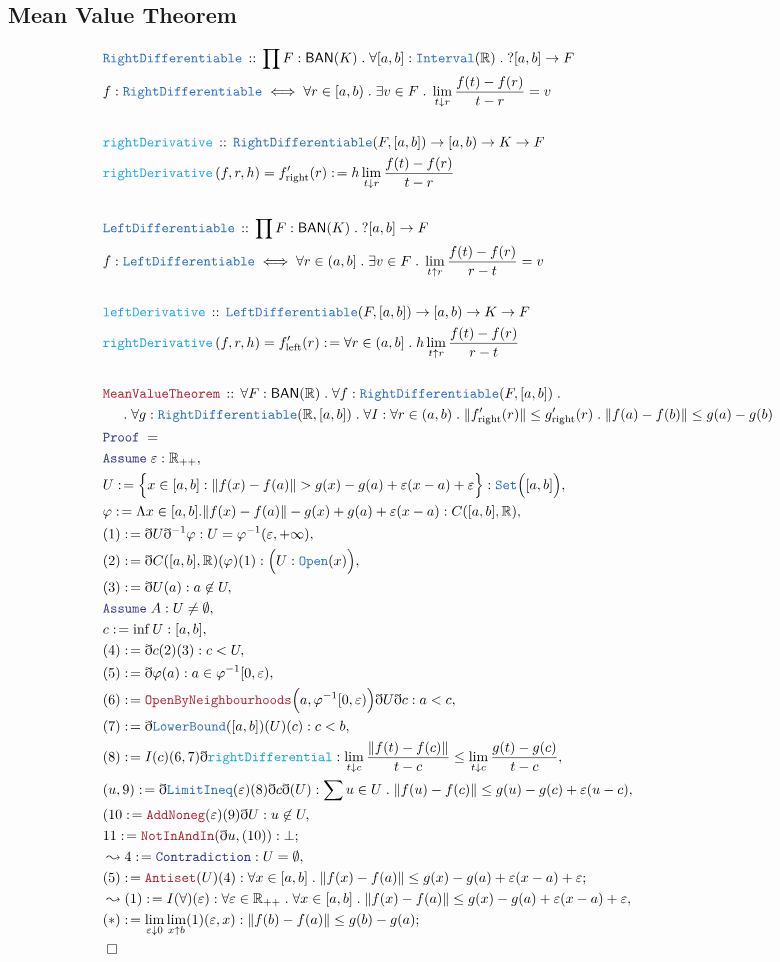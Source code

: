 \documentclass[12pt]{scrartcl}
\newcommand{\TYPE}[1]{\textcolor{NavyBlue}{\mathtt{#1}}}
\newcommand{\FUNC}[1]{\textcolor{Cerulean}{\mathtt{#1}}}
\newcommand{\LOGIC}[1]{\textcolor{Blue}{\mathtt{#1}}}
\newcommand{\THM}[1]{\textcolor{Maroon}{\mathtt{#1}}}
\renewcommand{\.}{\; . \;}
\newcommand{\de}{: \kern 0.1pc =}
\newcommand{\Act}[1]{\left( #1 \right)}
\newcommand{\Theorem}[2]{& \THM{#1} \, :: \, #2 \\ & \Proof = \\ }
\newcommand{\DeclareType}[2]{& \TYPE{#1} \, :: \, #2 \\}
\newcommand{\DefineType}[3]{& #1 : \TYPE{#2} \iff #3 \\}
\newcommand{\DeclareFunc}[2]{& \FUNC{#1} \, :: \, #2 \\}
\newcommand{\DefineNamedFunc}[4]{&  \FUNC{#1}\Act{#2} = #3 \de #4 \\}
\newcommand{\NewLine}{\\ & \kern 1pc}
\newcommand{\Page}[1]{\begin{align*} #1 \end{align*}   }
\newcommand{ \bd }{ \ByDef }
\newcommand{\Reals}{\mathbb{R} }
\newcommand{\Say}[3]{& #1 \de #2 : #3, \\}
\newcommand{\Conclude}[3]{& #1 \de #2 : #3; \\}
\newcommand{\Derive}[3]{& \leadsto #1 \de #2 : #3, \\}
\newcommand{\A}{\LOGIC{Assume} \;}
\newcommand{\Assume}[2]{& \A #1 : #2, \\}
\newcommand{\QED}{\; \square}
\newcommand{\EndProof}{& \QED \\}
\newcommand{\ByDef}{\eth}
\newcommand{\Proof}{\LOGIC{Proof} \; }
\newcommand{\BAN}{\mathsf{BAN}} %
\begin{document}
\subsection{Mean Value Theorem}
\Page{
	\DeclareType{RightDifferentiable}{ \prod F : \BAN(K) \. \forall [a,b] : \TYPE{Interval}(\Reals) \. ?[a,b] \to F }
	\DefineType{f}{RightDifferentiable}
	{ \forall r \in [a,b) \. \exists v \in F \. \lim_{t \downarrow r}  \frac{  f(t) - f(r) }{  t - r   } = v   }
	\\
	\DeclareFunc{rightDerivative}{ \TYPE{RightDifferentiable}(F,[a,b]) \to [a, b) \to  K \to F    }
	\DefineNamedFunc{rightDerivative}{ f,r,h  }{f'_{\mathrm{right}}(r)}{ h \lim_{t \downarrow r} \frac{ f(t) - f(r)}{  t - r }  
	}
	\\
	\DeclareType{LeftDifferentiable}{ \prod F : \BAN(K) \. ?[a,b] \to F }
	\DefineType{f}{LeftDifferentiable}
	{ \forall r \in (a,b] \. \exists v \in F \. \lim_{t \uparrow r}  \frac{  f(t) - f(r) }{ r -t  } = v   }
	\\
	\DeclareFunc{leftDerivative}{ \TYPE{LeftDifferentiable}(F,[a,b]) \to [a, b) \to  K \to F    }
	\DefineNamedFunc{rightDerivative}{ f,r,h  }{f'_{\mathrm{left}}(r)}{ \forall r \in (a,b] \.  h \lim_{t \uparrow r} \frac{ f(t) - f(r)}{  r - t   }
	}
	\\
	\Theorem{MeanValueTheorem}
	{
		\forall F : \BAN(\Reals) \.
		\forall f : \TYPE{RightDifferentiable}(F,[a,b]) \. 
		\NewLine \.
		\forall g : \TYPE{RightDifferentiable}(\Reals,[a,b]) \.
		\forall I : \forall r \in (a,b) \. \| f'_{\mathrm{right}}(r) \| \le g'_{\mathrm{right}}(r) \.  
		\| f(a) - f(b) \| \le g(a) - g(b)
	}
        \Assume{\varepsilon}{\Reals_{++}}
	\Say{U}{ \Big\{ x \in [a,b] : \| f(x) - f(a) \| > g(x) - g(a) + \varepsilon(x - a)  + \varepsilon \Big\}     }
	{ \TYPE{Set}\Big( [a,b] \Big)   }
	\Say{\varphi}{  \Lambda x \in [a,b]. \|f(x) - f(a)\| - g(x) + g(a) + \varepsilon(x - a)   }{ C([a,b],\Reals) }
	\Say{(1)}{\bd U \bd^{-1} \varphi }{ U = \varphi^{-1}(\varepsilon, + \infty)}
	\Say{(2)}{\bd C([a,b],\Reals)(\varphi)(1)}{\Big(U : \TYPE{Open}(x) \Big)  }
	\Say{(3)}{ \bd U(a)}{ a \not \in U }
	\Assume{A}{U \neq \emptyset}
	\Say{c}{  \inf U  }{[a,b]}
	\Say{(4)}{\bd c (2)(3)}{c < U}
	\Say{(5)}{ \bd \varphi(a)  }{a \in \varphi^{-1}[0,\varepsilon)  }
	\Say{(6)}{\THM{OpenByNeighbourhoods}\Big(a, \varphi^{-1}[0,\varepsilon)\Big)\bd U\bd c}{ a < c }
	\Say{(7)}{ \bd \TYPE{LowerBound}([a,b])(U)(c) }{ c  < b  }
	\Say{(8)}{I(c)(6,7) \bd \FUNC{rightDifferential}}
	{ \lim_{ t \downarrow c  } \frac{ \| f(t) - f(c) \|  }{t - c} \le   \lim_{t \downarrow c} \frac{  g(t) - g(c)  }{ t - c}}
	\Say{(u,9)}{ \bd \TYPE{LimitIneq}(\varepsilon)(8) \bd c \bd(U) }{ \sum u \in U \.  \| f(u) - f(c) \| \le  g(u)  - g(c) + \varepsilon(u - c) }
	\Say{(10}{\THM{AddNoneg}(  \varepsilon)(9)\bd U}{ u \not \in U }
	\Conclude{11}{\THM{NotInAndIn}(\bd u,(10))}{\bot}
	\Derive{4}{ \LOGIC{Contradiction}}{ U = \emptyset }
	\Conclude{(5)}{\THM{Antiset}(U)(4)}{  \forall x \in [a,b] \. \| f(x) - f(a) \| \le g(x) - g(a)  + \varepsilon(x - a) + \varepsilon  }
	\Derive{(1)}{ I(\forall)(\varepsilon)}{ \forall \varepsilon \in \Reals_{++}  \.  \forall x \in [a,b] \.  \| f(x) - f(a) \| \le g(x) - g(a) + \varepsilon(x - a) + \varepsilon}
	\Conclude{(*)}{ \lim_{\varepsilon \downarrow 0} \lim_{x \uparrow b} (1)(\varepsilon,x) }{ \| f(b) - f(a) \| \le g(b) - g(a) }
	\EndProof
}
\end{document}
